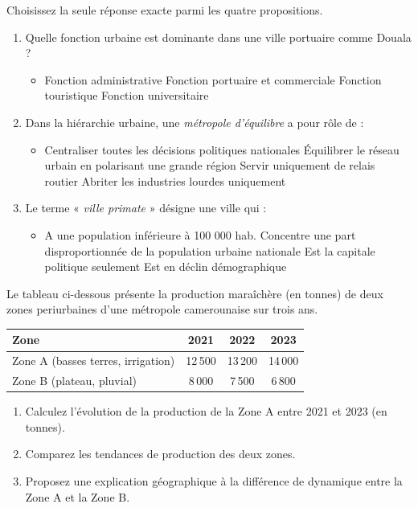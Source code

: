\documentclass[11pt]{article}
\begin{document}
\begin{exercice}
Choisissez la seule réponse exacte parmi les quatre propositions.
\begin{enumerate}
    \item Quelle fonction urbaine est dominante dans une ville portuaire comme Douala ?
    \begin{itemize}
        \item[A] Fonction administrative \quad [B] Fonction portuaire et commerciale \quad [C] Fonction touristique \quad [D] Fonction universitaire
    \end{itemize}
    \item Dans la hiérarchie urbaine, une \textit{métropole d'équilibre} a pour rôle de :
    \begin{itemize}
        \item[A] Centraliser toutes les décisions politiques nationales \quad [B] Équilibrer le réseau urbain en polarisant une grande région \quad [C] Servir uniquement de relais routier \quad [D] Abriter les industries lourdes uniquement
    \end{itemize}
    \item Le terme « \textit{ville primate} » désigne une ville qui :
    \begin{itemize}
        \item[A] A une population inférieure à 100 000 hab. \quad [B] Concentre une part disproportionnée de la population urbaine nationale \quad [C] Est la capitale politique seulement \quad [D] Est en déclin démographique
    \end{itemize}
\end{enumerate}
\end{exercice}

\begin{exercice}
Le tableau ci-dessous présente la production maraîchère (en tonnes) de deux zones periurbaines d'une métropole camerounaise sur trois ans.

\begin{center}
\begin{tabular}{|l|c|c|c|}
\hline
\textbf{Zone} & \textbf{2021} & \textbf{2022} & \textbf{2023} \\
\hline
Zone A (basses terres, irrigation) & 12\,500 & 13\,200 & 14\,000 \\
\hline
Zone B (plateau, pluvial) & 8\,000 & 7\,500 & 6\,800 \\
\hline
\end{tabular}
\end{center}

\begin{enumerate}
    \item Calculez l'évolution de la production de la Zone A entre 2021 et 2023 (en tonnes).
    \item Comparez les tendances de production des deux zones.
    \item Proposez une explication géographique à la différence de dynamique entre la Zone A et la Zone B.
\end{enumerate}
\end{exercice}
\end{document}
